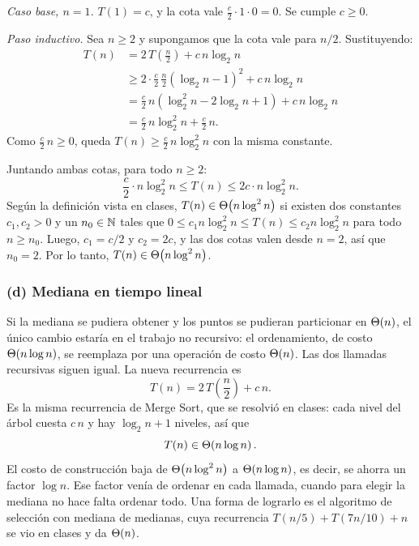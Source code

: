 \emph{Caso base, $n = 1$.} $T(1) = c$, y la cota vale
$\frac{c}{2} \cdot 1 \cdot 0 = 0$. Se cumple $c \ge 0$.

\emph{Paso inductivo.} Sea $n \ge 2$ y supongamos que la cota vale para $n/2$. Sustituyendo:
\[
\begin{aligned}
  T(n) &= 2\,T\!\left(\frac{n}{2}\right) + c\,n\log_2 n \\
       &\ge 2 \cdot \frac{c}{2}\, \frac{n}{2} \left(\log_2 n - 1\right)^2 + c\,n\log_2 n \\
       &= \frac{c}{2}\, n \left(\log_2^2 n - 2\log_2 n + 1\right) + c\,n\log_2 n \\
       &= \frac{c}{2}\, n\log_2^2 n + \frac{c}{2}\, n.
\end{aligned}
\]
Como $\frac{c}{2}\, n \ge 0$, queda $T(n) \ge \frac{c}{2}\, n\log_2^2 n$ con la misma
constante.

Juntando ambas cotas, para todo $n \ge 2$:
\[
  \frac{c}{2} \cdot n\log_2^2 n \le T(n) \le 2c \cdot n\log_2^2 n.
\]
Según la definición vista en clases, $T(n) \in \Theta\!\left(n\log^2 n\right)$ si existen dos constantes
$c_1, c_2 > 0$ y un $n_0 \in \mathbb{N}$ tales que $0 \le c_1 n\log_2^2 n \le T(n) \le c_2 n\log_2^2 n$
para todo $n \ge n_0$. Luego, $c_1 = c/2$ y $c_2 = 2c$, y las dos cotas valen desde
$n = 2$, así que $n_0 = 2$. Por lo tanto, $T(n) \in \Theta\!\left(n \log^2 n\right)$.

\subsubsection*{(d) Mediana en tiempo lineal}

Si la mediana se pudiera obtener y los puntos se pudieran particionar en $\Theta\!\left(n\right)$, el
único cambio estaría en el trabajo no recursivo: el ordenamiento, de costo $\Theta\!\left(n\log n\right)$,
se reemplaza por una operación de costo $\Theta\!\left(n\right)$. Las dos llamadas recursivas siguen igual.
La nueva recurrencia es
\[
  T(n) = 2\,T\!\left(\frac{n}{2}\right) + c\,n.
\]
Es la misma recurrencia de Merge Sort, que se resolvió en clases: cada nivel del árbol
cuesta $c\,n$ y hay $\log_2 n + 1$ niveles, así que
\[
  T(n) \in \Theta\!\left(n\log n\right).
\]
El costo de construcción baja de $\Theta\!\left(n\log^2 n\right)$ a $\Theta\!\left(n\log n\right)$, es decir, se ahorra un
factor $\log n$. Ese factor venía de ordenar en cada llamada, cuando para elegir la
mediana no hace falta ordenar todo. Una forma de lograrlo es el algoritmo de selección
con mediana de medianas, cuya recurrencia $T(n/5) + T(7n/10) + n$ se vio en clases y da
$\Theta\!\left(n\right)$.

